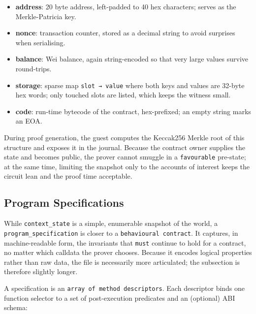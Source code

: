 \begin{itemize}
    \item \textbf{address}: 20 byte address, left-padded to 40 hex characters; serves as the Merkle-Patricia key.
    \item \textbf{nonce}: transaction counter, stored as a decimal string to avoid surprises when serialising.
    \item \textbf{balance}: Wei balance, again string-encoded so that very large values survive round-trips.
    \item \textbf{storage}: sparse map \verb|slot → value| where both keys and values are 32-byte hex words; only touched slots are listed, which keeps the witness small.
    \item \textbf{code}: run-time bytecode of the contract, hex-prefixed; an empty string marks an EOA.
\end{itemize}

During proof generation, the guest computes the Keccak256 Merkle root of this structure and exposes it in the journal.  
Because the contract owner supplies the state and becomes public, the prover cannot smuggle in a \texttt{favourable} pre-state; at the same time, limiting the snapshot only to the accounts of interest keeps the circuit lean and the proof time acceptable. 

\vspace{0.8em}

\subsection{Program Specifications}\makeatletter{}\makeatother\label{zkpoex_progspec}

While \texttt{context\_state} is a simple, enumerable snapshot of the world, a
\texttt{program\_specification} is closer to a \texttt{behavioural contract}.  
It captures, in machine-readable form, the invariants that \texttt{must} continue to
hold for a contract, no matter which calldata the prover chooses.  
Because it encodes logical properties rather than raw data, the file is
necessarily more articulated; the subsection is therefore slightly longer.

A specification is an \texttt{array of method descriptors}.  
Each descriptor binds one function selector to a set of post-execution
predicates and an (optional) ABI schema:

